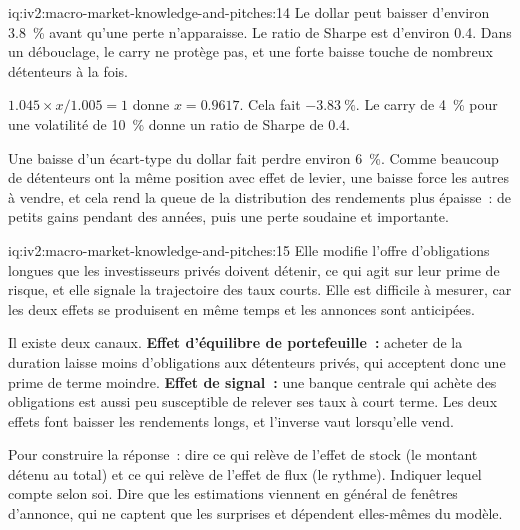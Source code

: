 \begin{solution}{iq:iv2:macro-market-knowledge-and-pitches:14}
Le dollar peut baisser d'environ 3.8~\% avant qu'une perte n'apparaisse. Le ratio de Sharpe est d'environ 0.4. Dans un débouclage, le carry ne protège pas, et une forte baisse touche de nombreux détenteurs à la fois.

$1.045 \times x/1.005 = 1$ donne $x = 0.9617$. Cela fait $-3.83~\%$. Le carry de 4~\% pour une volatilité de 10~\% donne un ratio de Sharpe de 0.4.

Une baisse d'un écart-type du dollar fait perdre environ 6~\%. Comme beaucoup de détenteurs ont la même position avec effet de levier, une baisse force les autres à vendre, et cela rend la queue de la distribution des rendements plus épaisse~: de petits gains pendant des années, puis une perte soudaine et importante.

\end{solution}

\begin{solution}{iq:iv2:macro-market-knowledge-and-pitches:15}
Elle modifie l'offre d'obligations longues que les investisseurs privés doivent détenir, ce qui agit sur leur prime de risque, et elle signale la trajectoire des taux courts. Elle est difficile à mesurer, car les deux effets se produisent en même temps et les annonces sont anticipées.

Il existe deux canaux. \textbf{Effet d'équilibre de portefeuille~:} acheter de la duration laisse moins d'obligations aux détenteurs privés, qui acceptent donc une prime de terme moindre. \textbf{Effet de signal~:} une banque centrale qui achète des obligations est aussi peu susceptible de relever ses taux à court terme. Les deux effets font baisser les rendements longs, et l'inverse vaut lorsqu'elle vend.

Pour construire la réponse~: dire ce qui relève de l'effet de stock (le montant détenu au total) et ce qui relève de l'effet de flux (le rythme). Indiquer lequel compte selon soi. Dire que les estimations viennent en général de fenêtres d'annonce, qui ne captent que les surprises et dépendent elles-mêmes du modèle.

\end{solution}

